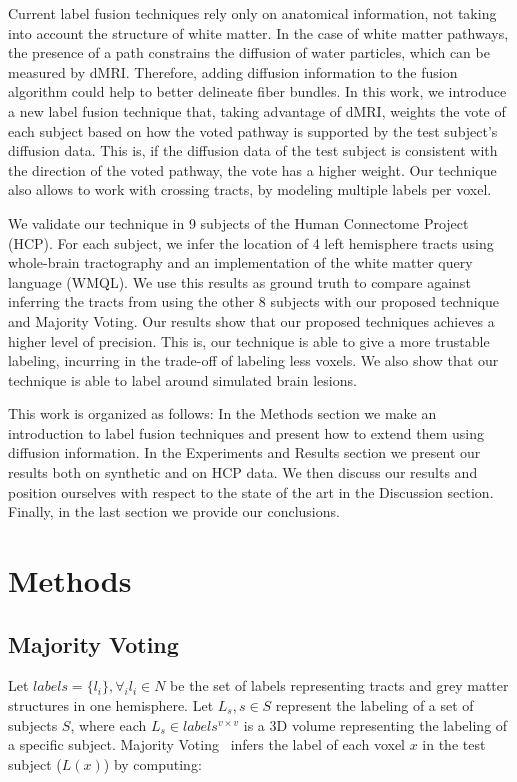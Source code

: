 Current label fusion techniques rely only on anatomical information, not taking 
into account the structure of white matter. In the case of white matter pathways,
the presence of a path constrains the diffusion of water particles, which can be
measured by dMRI. Therefore, adding diffusion information to the fusion algorithm
could help to better delineate fiber bundles. In this work, we introduce a new 
label fusion technique that, taking advantage of dMRI, weights the vote of each
subject based on how the voted pathway is supported by the test subject's diffusion
data. This is, if the diffusion data of the test subject is consistent with the
direction of the voted pathway, the vote has a higher weight. Our technique also
allows to work with crossing tracts, by modeling multiple labels per voxel.

We validate our technique in 9 subjects of the Human Connectome Project (HCP).
For each subject, we infer the location of 4 left hemisphere tracts using
whole-brain tractography and an implementation of the white matter query language
(WMQL). We use this results as ground truth to compare against inferring the
tracts from using the other 8 subjects with our proposed technique and Majority
Voting. Our results show that our proposed techniques achieves a higher level
of precision. This is, our technique is able to give a more trustable labeling,
incurring in the trade-off of labeling less voxels. We also show that our technique
is able to label around simulated brain lesions.

This work is organized as follows: In the Methods section we make an introduction
to label fusion techniques and present how to extend them using diffusion
information. In the Experiments and Results section we present our results 
both on synthetic and on HCP data. We then discuss our results and position
ourselves with respect to the state of the art in the Discussion section. 
Finally, in the last section we provide our conclusions.



\section{Methods}
\label{sec:methods}

\subsection{Majority Voting}
Let $labels = \{l_i\}, \forall_i l_i \in N$ be the set of labels representing
tracts and grey matter structures in one hemisphere. Let ${L_s}, s \in S$
represent the labeling of a set of subjects $S$, where each 
$L_s \in labels^{v\times v}$ is a 3D volume representing the labeling of a
specific subject. Majority Voting~\cite{Rohlfing2004} infers the label of
each voxel $x$ in the test subject ($L(x)$) by computing:

